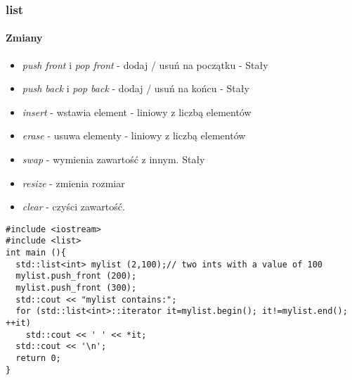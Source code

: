\documentclass[10pt]{beamer}
\begin{document}
\begin{frame}[fragile]
  \frametitle{list}
  \framesubtitle{Zmiany}
  \begin{itemize}
    \item \textit{push front} i \textit{pop front} - dodaj / usuń na początku - Stały
    \item \textit{push back} i \textit{pop back} - dodaj / usuń na końcu - Stały
    \item \textit{insert} - wstawia element - liniowy z liczbą elementów
    \item \textit{erase} - usuwa elementy - liniowy z liczbą elementów
    \item \textit{swap} - wymienia zawartość z innym. Stały
    \item \textit{resize} - zmienia rozmiar
    \item \textit{clear} - czyści zawartość.
  \end{itemize}
  \begin{lstlisting}
#include <iostream>
#include <list>
int main (){
  std::list<int> mylist (2,100);// two ints with a value of 100
  mylist.push_front (200);
  mylist.push_front (300);
  std::cout << "mylist contains:";
  for (std::list<int>::iterator it=mylist.begin(); it!=mylist.end(); ++it)
    std::cout << ' ' << *it;
  std::cout << '\n';
  return 0;
}
\end{lstlisting}
\end{frame}
\end{document}

